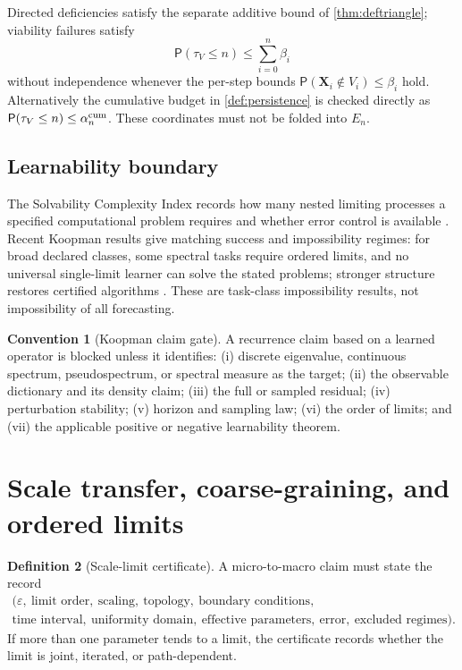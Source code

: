 \documentclass[11pt,a4paper]{article}
\theoremstyle{definition}
\newtheorem{definition}{Definition}[section]
\newtheorem{convention}[definition]{Convention}
\theoremstyle{plain}
\theoremstyle{remark}
\newcommand{\Prob}{\mathsf P}
\begin{document}
Directed deficiencies satisfy the separate additive bound of
\cref{thm:deftriangle}; viability failures satisfy
\[
\Prob(\tau_V\le n)
\le\sum_{i=0}^{n}\beta_i
\]
without independence whenever the per-step bounds
\(\Prob(\mathbf X_i\notin V_i)\le\beta_i\) hold.  Alternatively the cumulative budget
in \cref{def:persistence} is checked directly as
\(\Prob(\tau_V\le n)\le\alpha_n^{\rm cum}\).  These coordinates must not be folded into
\(E_n\).

\subsection{Learnability boundary}

The Solvability Complexity Index records how many nested limiting processes a
specified computational problem requires and whether error control is
available \citep{colbrookhansen2023}.  Recent Koopman results give matching
success and impossibility regimes: for broad declared classes, some spectral
tasks require ordered limits, and no universal single-limit learner can solve
the stated problems; stronger structure restores certified algorithms
\citep{colbrookmezic2026}.  These are task-class impossibility results, not
impossibility of all forecasting.

\begin{convention}[Koopman claim gate]
A recurrence claim based on a learned operator is blocked unless it identifies:
(i) discrete eigenvalue, continuous spectrum, pseudospectrum, or spectral
measure as the target; (ii) the observable dictionary and its density claim;
(iii) the full or sampled residual; (iv) perturbation stability; (v) horizon
and sampling law; (vi) the order of limits; and (vii) the applicable positive
or negative learnability theorem.
\end{convention}

\section{Scale transfer, coarse-graining, and ordered limits}
\label{sec:scale}

\begin{definition}[Scale-limit certificate]\label{def:scalecert}
A micro-to-macro claim must state the record
\[
\begin{gathered}
(\varepsilon,\ \text{limit order},\ \text{scaling},\ \text{topology},
\ \text{boundary conditions},\\
\text{time interval},\ \text{uniformity domain},\ \text{effective
parameters},\ \text{error},\ \text{excluded regimes}).
\end{gathered}
\]
If more than one parameter tends to a limit, the certificate records whether
the limit is joint, iterated, or path-dependent.
\end{definition}
\end{document}
